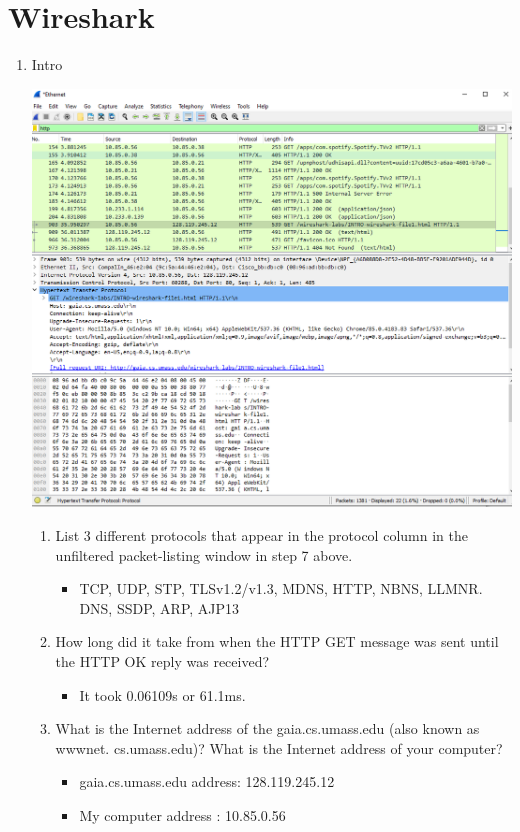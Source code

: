 \documentclass[11pt]{article}
\begin{document}
\section{Wireshark}
\begin{enumerate}[label=(\alph*)]
\item Intro 
\begin{center}
    \includegraphics[width=.9\textwidth]{HW1Template/Wireshark_Intro.PNG}
\end{center}
\begin{enumerate}[label=(\arabic*)]
    \item List 3 different protocols that appear in the protocol column in the unfiltered
packet-listing window in step 7 above.
        \begin{itemize}
            \item TCP, UDP, STP, TLSv1.2/v1.3, MDNS, HTTP, NBNS, LLMNR. DNS, SSDP, ARP, AJP13
        \end{itemize}
    \item How long did it take from when the HTTP GET message was sent until the HTTP
OK reply was received?
    \begin{itemize}
        \item It took 0.06109s or 61.1ms.
    \end{itemize}
    
    \item What is the Internet address of the gaia.cs.umass.edu (also known as wwwnet.
cs.umass.edu)? What is the Internet address of your computer?
    \begin{itemize}
        \item gaia.cs.umass.edu address: 128.119.245.12
        \item My computer address : 10.85.0.56
    \end{itemize}
    

\end{enumerate}
\end{enumerate}
\end{document}
